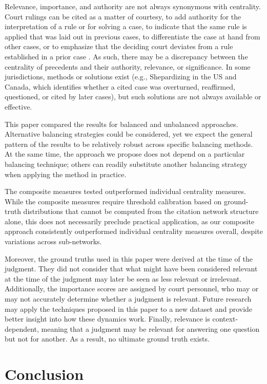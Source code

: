 \documentclass[sigconf,authordraft]{acmart}
\begin{document}
Relevance, importance, and authority are not always synonymous with centrality. Court rulings can be cited as a matter of courtesy, to add authority for the interpretation of a rule or for solving a case, to indicate that the same rule is applied that was laid out in previous cases, to differentiate the case at hand from other cases, or to emphasize that the deciding court deviates from a rule established in a prior case \cite{Derlen_etal_2014}\cite{vankuppevelt2020}\cite{Whalen2016}. As such, there may be a discrepancy between the centrality of precedents and their authority, relevance, or significance. In some jurisdictions, methods or solutions exist (e.g., Shepardizing in the US and Canada, which identifies whether a cited case was overturned, reaffirmed, questioned, or cited by later cases), but such solutions are not always available or effective.

This paper compared the results for balanced and unbalanced approaches. Alternative balancing strategies could be considered, yet we expect the general pattern of the results to be relatively robust across specific balancing methods. At the same time, the approach we propose does not depend on a particular balancing technique; others can readily substitute another balancing strategy when applying the method in practice.

The composite measures tested outperformed individual centrality measures. While the composite measures require threshold calibration based on ground-truth distributions that cannot be computed from the citation network structure alone, this does not necessarily preclude practical application, as our composite approach consistently outperformed individual centrality measures overall, despite variations across sub-networks.

Moreover, the ground truths used in this paper were derived at the time of the judgment. They did not consider that what might have been considered relevant at the time of the judgment may later be seen as less relevant or irrelevant. Additionally, the importance scores are assigned by court personnel, who may or may not accurately determine whether a judgment is relevant.
Future research may apply the techniques proposed in this paper to a new dataset and provide better insight into how these dynamics work.
Finally, relevance is context-dependent, meaning that a judgment may be relevant for answering one question but not for another. As a result, no ultimate ground truth exists.


\section{Conclusion}
\end{document}
